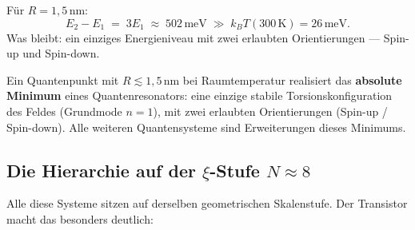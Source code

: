 Für $R = 1{,}5$\,nm:
\begin{equation}
  E_2 - E_1 \;=\; 3 E_1 \;\approx\; 502\,\text{meV}
  \;\gg\; k_BT(300\,\text{K}) = 26\,\text{meV.}
\end{equation}
Was bleibt: ein einziges Energieniveau mit zwei erlaubten
Orientierungen --- Spin-up und Spin-down.

\begin{foundation}
Ein Quantenpunkt mit $R \lesssim 1{,}5$\,nm bei Raumtemperatur
realisiert das \textbf{absolute Minimum} eines Quantenresonators:
eine einzige stabile Torsionskonfiguration des Feldes (Grundmode $n=1$),
mit zwei erlaubten Orientierungen (Spin-up / Spin-down).
Alle weiteren Quantensysteme sind Erweiterungen dieses Minimums.
\end{foundation}

\subsection{Die Hierarchie auf der \texorpdfstring{$\xi$}{xi}-Stufe
  \texorpdfstring{$N \approx 8$}{N~8}}

Alle diese Systeme sitzen auf derselben geometrischen Skalenstufe.
Der Transistor macht das besonders deutlich:

\begin{center}
\end{center}

